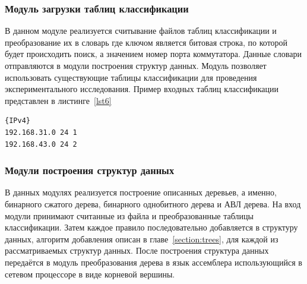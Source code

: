 \documentclass[9pt,a4paper]{article}
\begin{document}
        \subsubsection{Модуль загрузки таблиц классификации}
            \label{section:tablemod}
            В данном модуле реализуется считывание файлов таблиц классификации и преобразование их в словарь где ключом является битовая строка,
            по которой будет происходить поиск, а значением номер порта коммутатора. Данные словари отправляются в модули построения структур данных.
            Модуль позволяет использовать существующие таблицы классификации для проведения экспериментального исследования.
            Пример входных таблиц классификации представлен в листинге~\ref{lst6}\\
\begin{lstlisting}[caption=Пример таблиц классификации, label=lst6]
{IPv4}
192.168.31.0 24 1
192.168.43.0 24 2
\end{lstlisting}
        \subsubsection{Модули построения структур данных}
            В данных модулях реализуется построение описанных деревьев, а именно, бинарного сжатого дерева, бинарного однобитного дерева и АВЛ дерева.
            На вход модули принимают считанные из файла и преобразованные таблицы классификации.
            Затем каждое правило последовательно добавляется в структуру данных, алгоритм добавления описан в главе~\ref{section:trees}, для каждой из 
            рассматриваемых структур данных.
            После построения структура данных передаётся в модуль преобразования дерева в язык ассемблера использующийся в сетевом процессоре в виде корневой вершины.
            
\end{document}
